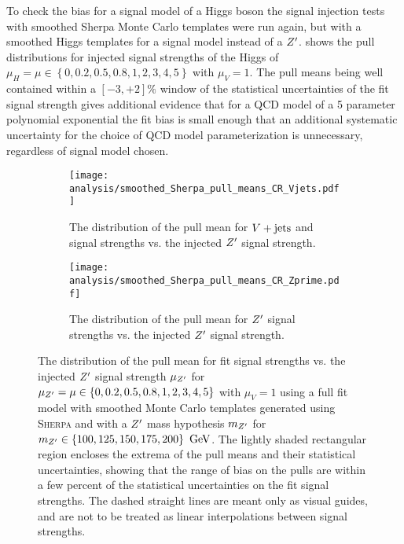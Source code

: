 To check the bias for a signal model of a Higgs boson the signal injection tests with smoothed Sherpa Monte Carlo templates were run again, but with a smoothed Higgs templates for a signal model instead of a $\Zprime$.
 shows the pull distributions for injected signal strengths of the Higgs of $\mu_{H} = \mu \in \left\{0, 0.2, 0.5, 0.8, 1, 2, 3, 4, 5\right\}$ with $\mu_{V} = 1$.
The pull means being well contained within a $\left[-3,+2\right]\%$ window of the statistical uncertainties of the fit signal strength gives additional evidence that for a QCD model of a 5 parameter polynomial exponential the fit bias is small enough that an additional systematic uncertainty for the choice of QCD model parameterization is unnecessary, regardless of signal model chosen.

\begin{figure}[htbp]
 \centering
 \begin{subfigure}[t]{0.48\textwidth}
  \centering
  \texttt{[image: analysis/smoothed\_Sherpa\_pull\_means\_CR\_Vjets.pdf]}
  \caption[The distribution of the pull mean for $\Vjets$ and signal strengths vs. the injected $\Zprime$ signal strength.]{%
   The distribution of the pull mean for $\Vjets$ and signal strengths vs. the injected $\Zprime$ signal strength.}
  \label{fig:pulls_Vjets_Sherpa}
 \end{subfigure}%
 \quad
 \begin{subfigure}[t]{0.48\textwidth}
  \centering
  \texttt{[image: analysis/smoothed\_Sherpa\_pull\_means\_CR\_Zprime.pdf]}
  \caption[The distribution of the pull mean for $\Zprime$ signal strengths vs. the injected $\Zprime$ signal strength.]{%
   The distribution of the pull mean for $\Zprime$ signal strengths vs. the injected $\Zprime$ signal strength.}
  \label{fig:pulls_Zprime_Sherpa}
 \end{subfigure}
 \caption[The distribution of the pull mean for fit signal strengths vs. the injected $\Zprime$ signal strength with \textsc{Sherpa} Monte Carlo templates.]{%
  The distribution of the pull mean for fit signal strengths vs. the injected $\Zprime$ signal strength $\mu_{Z'}$ for $\mu_{Z'} = \mu \in \left\{0, 0.2, 0.5, 0.8, 1, 2, 3, 4, 5\right\}$ with $\mu_{V} = 1$ using a full fit model with smoothed Monte Carlo templates generated using \textsc{Sherpa} and with a $\Zprime$ mass hypothesis $m_{Z'}$ for
  $m_{Z'} \in \left\{100, 125, 150, 175, 200\right\}~\mathrm{GeV}$.
  The lightly shaded rectangular region encloses the extrema of the pull means and their statistical uncertainties, showing that the range of bias on the pulls are within a few percent of the statistical uncertainties on the fit signal strengths.
  The dashed straight lines are meant only as visual guides, and are not to be treated as linear interpolations between signal strengths.}
 \label{fig:pulls_summary_smoothed_Sherpa}
\end{figure}

